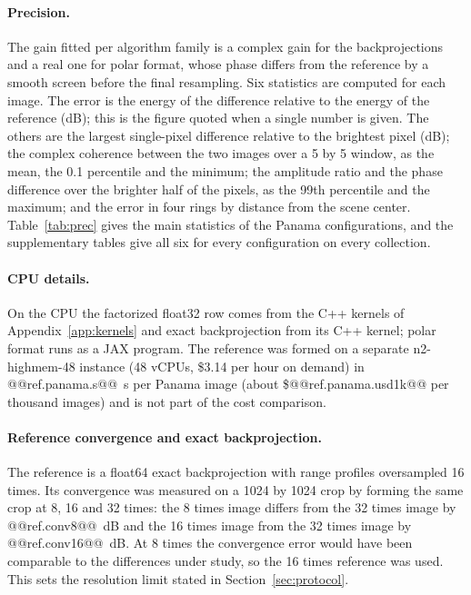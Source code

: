 \documentclass[11pt]{article}
\begin{document}


\paragraph{Precision.} The gain fitted per algorithm family is a complex gain for the backprojections and a real one for polar format, whose phase differs from the reference by a smooth screen before the final resampling. Six statistics are computed for each image. The error is the energy of the difference relative to the energy of the reference (dB); this is the figure quoted when a single number is given. The others are the largest single-pixel difference relative to the brightest pixel (dB); the complex coherence between the two images over a 5 by 5 window, as the mean, the 0.1 percentile and the minimum; the amplitude ratio and the phase difference over the brighter half of the pixels, as the 99th percentile and the maximum; and the error in four rings by distance from the scene center. Table~\ref{tab:prec} gives the main statistics of the Panama configurations, and the supplementary tables give all six for every configuration on every collection.

\paragraph{CPU details.} On the CPU the factorized float32 row comes from the C++ kernels of Appendix~\ref{app:kernels} and exact backprojection from its C++ kernel; polar format runs as a JAX program. The reference was formed on a separate n2-highmem-48 instance (48 vCPUs, \$3.14 per hour on demand) in @@ref.panama.s@@~s per Panama image (about \$@@ref.panama.usd1k@@ per thousand images) and is not part of the cost comparison.

\paragraph{Reference convergence and exact backprojection.} The reference is a float64 exact backprojection with range profiles oversampled 16 times. Its convergence was measured on a 1024 by 1024 crop by forming the same crop at 8, 16 and 32 times: the 8 times image differs from the 32 times image by @@ref.conv8@@~dB and the 16 times image from the 32 times image by @@ref.conv16@@~dB. At 8 times the convergence error would have been comparable to the differences under study, so the 16 times reference was used. This sets the resolution limit stated in Section~\ref{sec:protocol}.
\end{document}
